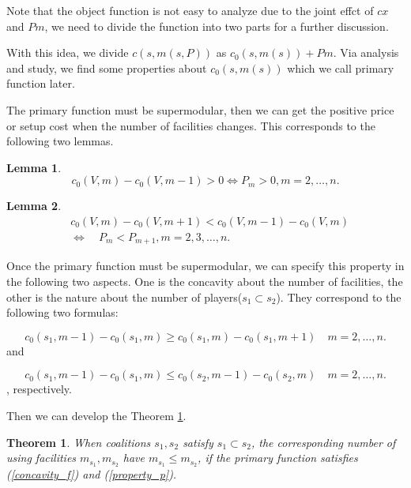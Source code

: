 \documentclass[UTF8]{article}
\newtheorem{thm}{\hspace{2em}Theorem}
\newtheorem{lem}{\hspace{2em}Lemma}
\begin{document}
Note that the object function is not easy to analyze due to the joint effct of $cx$ and $Pm$, we need to divide the function into two parts for a further discussion.

With this idea, we divide $c(s,m(s,P))$ as $c_0(s,m(s))+Pm $. Via analysis and study, we find some properties about $c_0(s,m(s)) $ which we call primary function later.

The primary function must be supermodular, then we can get the positive price or setup cost when the number of facilities changes. This corresponds to the following two lemmas.


\begin{lem}\label{lem2}
\[c_0(V,m)- c_0(V,m-1) > 0 \Leftrightarrow P_m > 0, m=2,\ldots,n.\]

\end{lem}

\begin{lem}\label{lem3}
\[
\begin{aligned}
&c_0 (V,m) - c_0 (V,m+1) < c_0 (V,m-1) - c_0 (V,m) \\
&\Leftrightarrow \quad P_m < P_{m+1} , m=2,3,\ldots,n.
\end{aligned}
\]
\end{lem}

Once the primary function must be supermodular, we can specify this property in the following two aspects.
One is the concavity about the number of facilities,
the other is the nature about the number of players($s_1 \subset s_2$).
They correspond to the following two formulas:

\begin{equation}\label{concavity_f}
c_0(s_1,m-1)-c_0(s_1,m) \geq
  c_0(s_1,m)-c_0(s_1,m+1) \quad m=2,\ldots,n.
\end{equation}
and

\begin{equation}\label{property_p}
	c_0(s_1,m-1)-c_0(s_1,m) \leq
	  c_0(s_2,m-1)-c_0(s_2,m) \quad m=2,\ldots,n.
\end{equation}
, respectively.

Then we can develop the Theorem \ref{thm7}.

\begin{thm}\label{thm7}
When coalitions $s_1,s_2$ satisfy $s_1 \subset s_2$, the corresponding number of using facilities $ m_{s_1}, m_{s_2}$ have $m_{s_1} \leq m_{s_2}$, if the primary function satisfies  (\ref{concavity_f}) and (\ref{property_p}).
\end{thm}
\end{document}
